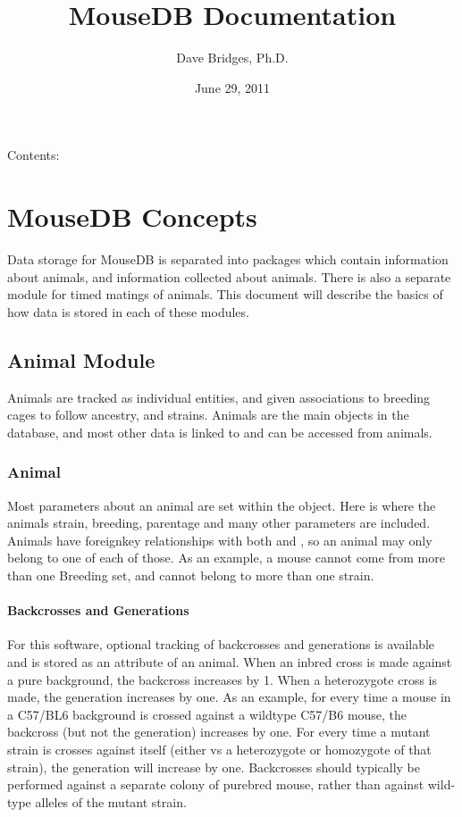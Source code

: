 \documentclass[letterpaper,10pt,english]{sphinxmanual}
\title{MouseDB Documentation}
\date{June 29, 2011}
\author{Dave Bridges, Ph.D.}
\begin{document}
\maketitle
\tableofcontents
{}\label{index::doc}


Contents:


\chapter{MouseDB Concepts}
\label{concepts:welcome-to-mousedb-s-documentation}\label{concepts::doc}\label{concepts:mousedb-concepts}
Data storage for MouseDB is separated into packages which contain information about animals, and information collected about animals.  There is also a separate module for timed matings of animals.  This document will describe the basics of how data is stored in each of these modules.


\section{Animal Module}
\label{concepts:animal-module}
Animals are tracked as individual entities, and given associations to breeding cages to follow ancestry, and strains.  Animals are the main objects in the database, and most other data is linked to and can be accessed from animals.


\subsection{Animal}
\label{concepts:animal}
Most parameters about an animal are set within the {\hyperref[api:mousedb.animal.models.Animal]{}} object. Here is where the animals strain, breeding, parentage and many other parameters are included.  Animals have foreignkey relationships with both {\hyperref[api:mousedb.animal.models.Strain]{}} and {\hyperref[api:mousedb.animal.models.Breeding]{}}, so an animal may only belong to one of each of those.  As an example, a mouse cannot come from more than one Breeding set, and cannot belong to more than one strain.


\subsubsection{Backcrosses and Generations}
\label{concepts:backcrosses-and-generations}
For this software, optional tracking of backcrosses and generations is available and is stored as an attribute of an animal.  When an inbred cross is made against a pure background, the backcross increases by 1.  When a heterozygote cross is made, the generation increases by one.  As an example, for every time a mouse in a C57/BL6 background is crossed against a wildtype C57/B6 mouse, the backcross (but not the generation) increases by one.  For every time a mutant strain is crosses against itself (either vs a heterozygote or homozygote of that strain), the generation will increase by one.  Backcrosses should typically be performed against a separate colony of purebred mouse, rather than against wild-type alleles of the mutant strain.
\end{document}

